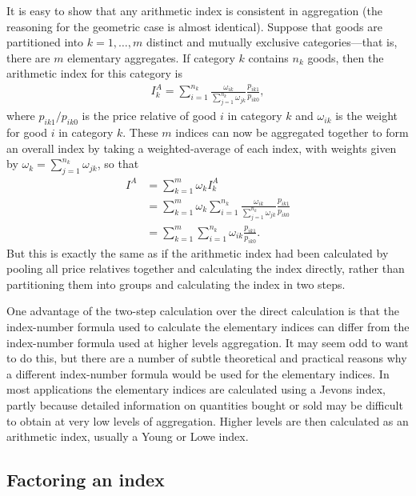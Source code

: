 \documentclass[
]{article}
\begin{document}
It is easy to show that any arithmetic index is consistent in aggregation (the reasoning for the geometric case is almost identical). Suppose that goods are partitioned into \(k=1,\ldots,m\) distinct and mutually exclusive categories---that is, there are \(m\) elementary aggregates. If category \(k\) contains \(n_{k}\) goods, then the arithmetic index for this category is
\begin{align*}
I_{k}^{A} = \sum_{i = 1}^{n_k} \frac{\omega_{ik}}{\sum_{j = 1}^{n_k} \omega_{jk}} \frac{p_{ik1}}{p_{ik0}},
\end{align*}
where \(p_{ik1} / p_{ik0}\) is the price relative of good \(i\) in category \(k\) and \(\omega_{ik}\) is the weight for good \(i\) in category \(k\). These \(m\) indices can now be aggregated together to form an overall index by taking a weighted-average of each index, with weights given by \(\omega_{k} = \sum_{j = 1}^{n_k} \omega_{jk}\), so that
\begin{align*}
I^{A} &= \sum_{k = 1}^{m} \omega_k I_{k}^{A}  \\
&= \sum_{k = 1}^{m} \omega_k \sum_{i = 1}^{n_k} \frac{\omega_{ik}}{\sum_{j = 1}^{n_k} \omega_{jk}} \frac{p_{ik1}}{p_{ik0}} \\
&= \sum_{k = 1}^{m} \sum_{i = 1}^{n_k} \omega_{ik} \frac{p_{ik1}}{p_{ik0}}.
\end{align*}
But this is exactly the same as if the arithmetic index had been calculated by pooling all price relatives together and calculating the index directly, rather than partitioning them into groups and calculating the index in two steps.

One advantage of the two-step calculation over the direct calculation is that the index-number formula used to calculate the elementary indices can differ from the index-number formula used at higher levels aggregation. It may seem odd to want to do this, but there are a number of subtle theoretical and practical reasons why a different index-number formula would be used for the elementary indices. In most applications the elementary indices are calculated using a Jevons index, partly because detailed information on quantities bought or sold may be difficult to obtain at very low levels of aggregation. Higher levels are then calculated as an arithmetic index, usually a Young or Lowe index.

\hypertarget{factoring-an-index}{%
\subsection{Factoring an index}\label{factoring-an-index}}
\end{document}
